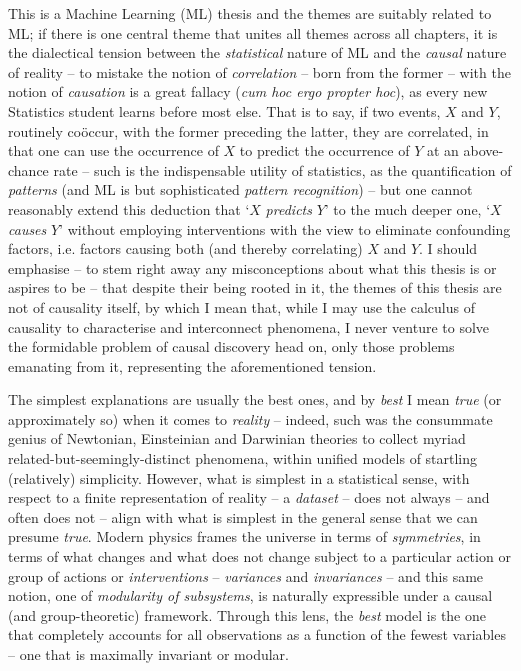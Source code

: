 %
This is a Machine Learning (ML) thesis and the themes are suitably related to ML; if there
is one central theme that unites all themes across all chapters, it is the dialectical tension
between the \emph{statistical} nature of ML and the \emph{causal} nature of reality -- to mistake
the notion of \emph{correlation} -- born from the former -- with the notion of \emph{causation} is
a great fallacy (\emph{cum hoc ergo propter hoc}), as every new Statistics student learns before
most else.
%
That is to say, if two events, \(X\) and \(Y\), routinely co{\"o}ccur, with the former preceding
the latter, they are correlated, in that one can use the occurrence of \(X\) to predict the
occurrence of \(Y\) at an above-chance rate -- such is the indispensable utility of statistics, as
the quantification of \emph{patterns} (and ML is but sophisticated \emph{pattern recognition}) --
but one cannot reasonably extend this deduction that `\(X\) \emph{predicts} \(Y\)' to the much
deeper one, `\(X\) \emph{causes} \(Y\)' without employing interventions with the view to eliminate
confounding factors, i.e. factors causing both (and thereby correlating) \(X\) and \(Y\).
%
I should emphasise -- to stem right away any misconceptions about what this thesis is or aspires to
be -- that despite their being rooted in it, the themes of this thesis are not of causality itself,
by which I mean that, while I may use the calculus of causality to characterise and interconnect
phenomena, I never venture to solve the formidable problem of causal discovery head on, only those
problems emanating from it, representing the aforementioned tension.
%

The simplest explanations are usually the best ones, and by \emph{best} I mean \emph{true} (or
approximately so) when it comes to \emph{reality} -- indeed, such was the consummate genius of
Newtonian, Einsteinian and Darwinian theories to collect myriad related-but-seemingly-distinct
phenomena, within unified models of startling (relatively) simplicity.
%
However, what is simplest in a statistical sense, with respect to a finite representation of
reality -- a \emph{dataset} -- does not always -- and often does not -- align with what is simplest
in the general sense that we can presume \emph{true}.
%
Modern physics frames the universe in terms of \emph{symmetries}, in terms of what changes and what
does not change subject to a particular action or group of actions or \emph{interventions} --
\emph{variances} and \emph{invariances} -- and this same notion, one of \emph{modularity of
subsystems}, is naturally expressible under a causal (and group-theoretic) framework.
%
Through this lens, the \emph{best} model is the one that completely accounts for all observations
as a function of the fewest variables -- one that is maximally invariant or modular.

